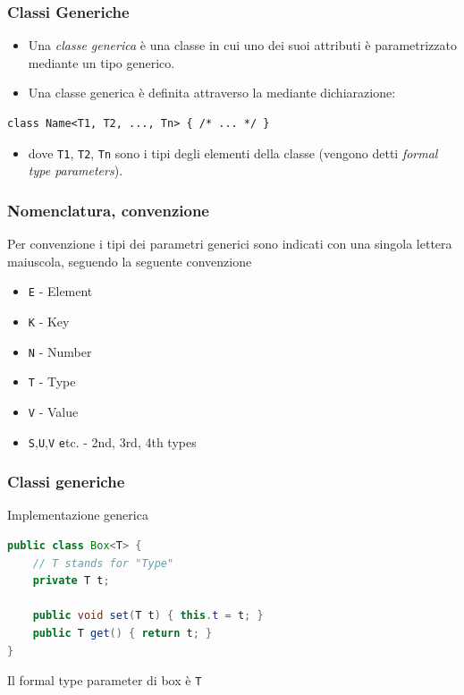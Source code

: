 \documentclass{beamer}
\begin{document}
%

\begin{frame}[fragile]
\frametitle{Classi Generiche}
\begin{itemize}
\item Una \emph{classe generica} \`e una classe in cui uno dei suoi attributi \`e parametrizzato mediante un tipo generico. 
\item Una classe generica \`e definita attraverso la mediante dichiarazione:
\end{itemize}
\begin{lstlisting}
class Name<T1, T2, ..., Tn> { /* ... */ }
\end{lstlisting}
\begin{itemize}
\item dove \texttt{T1}, \texttt{T2}, \texttt{Tn} sono i tipi degli elementi della classe (vengono detti \emph{formal type parameters}).
\end{itemize}
\end{frame}

\begin{frame}
\frametitle{Nomenclatura, convenzione}
Per convenzione i tipi dei parametri generici sono indicati con una singola lettera maiuscola, seguendo la seguente convenzione
\begin{itemize}
\item \texttt{E} - Element
\item \texttt{K} - Key
\item \texttt{N} - Number
\item \texttt{T} - Type
\item \texttt{V} - Value
\item \texttt{S},\texttt{U},\texttt{V} \texttt etc. - 2nd, 3rd, 4th types
\end{itemize}
\end{frame}


\begin{frame}[fragile]
\frametitle{Classi generiche}
Implementazione generica
\begin{framed}
\begin{lstlisting}[language=Java]
public class Box<T> {
    // T stands for "Type"
    private T t;

    public void set(T t) { this.t = t; }
    public T get() { return t; }
}
\end{lstlisting}
\end{framed}
Il formal type parameter di box \`e \texttt{T}
\end{frame}
\end{document}
